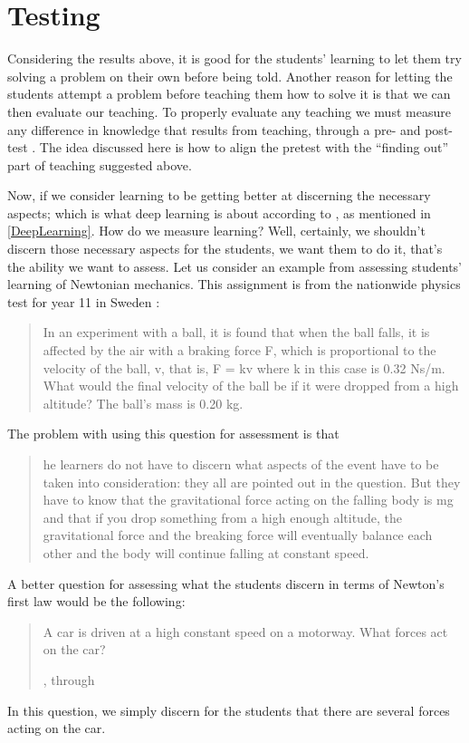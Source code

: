 \section{Testing}

Considering the results above, it is good for the students' learning to let 
them try solving a problem on their own before being told.
Another reason for letting the students attempt a problem before teaching them 
how to solve it is that we can then evaluate our teaching.
To properly evaluate any teaching we must measure any difference in knowledge 
that results from teaching, through a pre- and 
post-test \parencite{NecessaryConditionsOfLearning}.
The idea discussed here is how to align the pretest with the \enquote{finding 
out} part of teaching suggested above.

Now, if we consider learning to be getting better at discerning the necessary 
aspects; which is what deep learning is about according to 
\textcite{NecessaryConditionsOfLearning}, as mentioned in \cref{DeepLearning}.
How do we measure learning?
Well, certainly, we shouldn't discern those necessary aspects for the students, 
we want them to do it, that's the ability we want to assess.
Let us consider an example from assessing students' learning of Newtonian 
mechanics.
This assignment is from the nationwide physics test for year 11 in Sweden 
\parencite{NecessaryConditionsOfLearning}:
\blockquote{%
  In an experiment with a ball, it is found that when the ball falls, it is 
  affected by the air with a braking force F, which is proportional to the 
  velocity of the ball, v, that is, F = kv where k in this case is 0.32 Ns/m. 
  What would the final velocity of the ball be if it were dropped from a high 
  altitude? The ball’s mass is 0.20 kg.%
}
The problem with using this question for assessment is that 
\blockquote[{\cite[p.~90]{NecessaryConditionsOfLearning}}]{%
  he learners do not have to discern what aspects of the event have 
  to be taken into consideration: they all are pointed out in the question.
  But they have to know that the gravitational force acting on the falling body 
  is mg and that if you drop something from a high enough altitude, the 
  gravitational force and the breaking force will eventually balance each other 
  and the body will continue falling at constant speed.
}
A better question for assessing what the students discern in terms of Newton's 
first law would be the following: 
\blockquote[{\cite[p.~237]{johansson1985approach}}, through 
{\cite[p.~91]{NecessaryConditionsOfLearning}}]{%
  A car is driven at a high constant speed on a motorway. What forces act on 
  the car?%
}
In this question, we simply discern for the students that there are several 
forces acting on the car.

